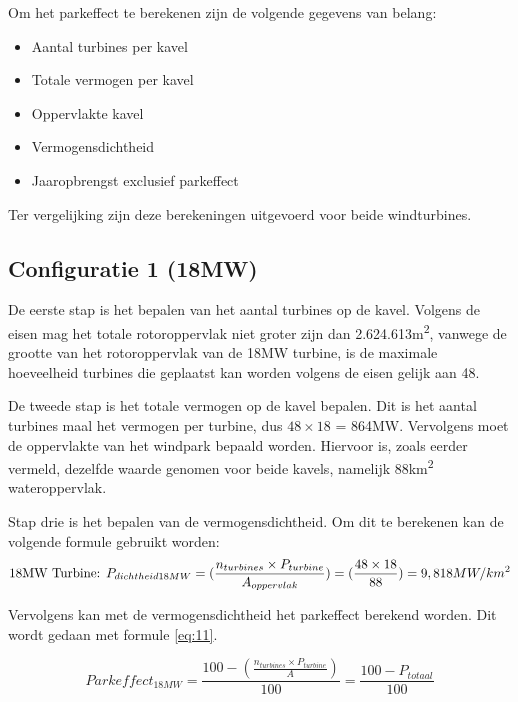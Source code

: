 Om het parkeffect te berekenen zijn de volgende gegevens van belang: 
\begin{itemize}
    \item Aantal turbines per kavel
    \item Totale vermogen per kavel
    \item Oppervlakte kavel
    \item Vermogensdichtheid 
    \item Jaaropbrengst exclusief parkeffect
\end{itemize}

Ter vergelijking zijn deze berekeningen uitgevoerd voor beide windturbines. 

\subsection{Configuratie 1 (18MW)}
De eerste stap is het bepalen van het aantal turbines op de kavel. Volgens de eisen mag het totale rotoroppervlak niet groter zijn dan 2.624.613m\textsuperscript{2}, vanwege de grootte van het rotoroppervlak van de 18MW turbine, is de maximale hoeveelheid turbines die geplaatst kan worden volgens de eisen gelijk aan 48. 

De tweede stap is het totale vermogen op de kavel bepalen. Dit is het aantal turbines maal het vermogen per turbine, dus \(48\times 18\) = 864MW.  Vervolgens moet de oppervlakte van het windpark bepaald worden. Hiervoor is, zoals eerder vermeld, dezelfde waarde genomen voor beide kavels, namelijk 88km\textsuperscript{2} wateroppervlak. 

Stap drie is het bepalen van de vermogensdichtheid. Om dit te berekenen kan de volgende formule gebruikt worden: 
\begin{equation} \label{eq:10}
\text{18MW Turbine: } P_{dichtheid18MW}=(\frac{n_{turbines}\times P_{turbine}}{A_{oppervlak}}) = (\frac{48\times 18}{88}) = 9,818 MW/km\textsuperscript{2}
\end{equation}

Vervolgens kan met de vermogensdichtheid het parkeffect berekend worden. Dit wordt gedaan met formule \ref{eq:11}. 

\begin{equation} \label{eq:11}
 Parkeffect_{18MW}=\frac{100-(\frac{n_{turbines}\times P_{turbine}}{A})}{100} = \frac{100-P_{totaal}}{100}
\end{equation}

